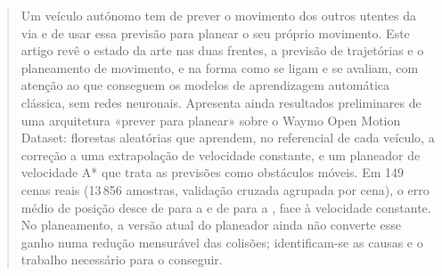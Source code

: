 \begin{abstract}
Um veículo autónomo tem de prever o movimento dos outros utentes da via e
de usar essa previsão para planear o seu próprio movimento. Este artigo
revê o estado da arte nas duas frentes, a previsão de trajetórias e o
planeamento de movimento, e na forma como se ligam e se avaliam, com
atenção ao que conseguem os modelos de aprendizagem automática clássica,
sem redes neuronais. Apresenta ainda resultados preliminares de uma
arquitetura «prever para planear» sobre o Waymo Open Motion Dataset:
florestas aleatórias que aprendem, no referencial de cada veículo, a
correção a uma extrapolação de velocidade constante, e um planeador de
velocidade A* que trata as previsões como obstáculos móveis. Em 149 cenas
reais (13\,856 amostras, validação cruzada agrupada por cena), o erro
médio de posição desce de  para  a  e de
 para  a , face à velocidade constante.
No planeamento, a versão atual do planeador ainda não converte esse ganho
numa redução mensurável das colisões; identificam-se as causas e o
trabalho necessário para o conseguir.

\keywords{\palavraschave}
\end{abstract}
